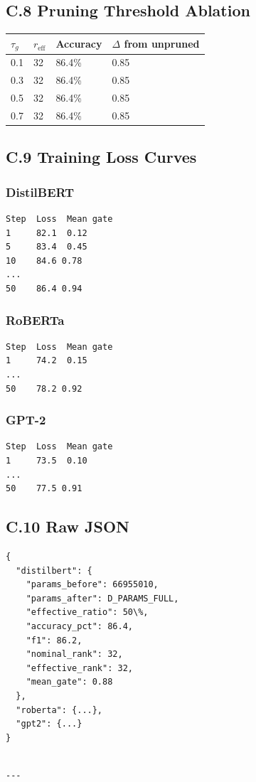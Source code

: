 \subsection{C.8 Pruning Threshold Ablation}

\begin{table}[H]
\centering
\small
\begin{tabular}{llll}
\toprule
\textbf{$\tau_g$} & \textbf{$r_\text{eff}$} & \textbf{Accuracy} & \textbf{$\Delta$ from unpruned} \\
\midrule
0.1 & 32 & 86.4\% & 0.85 \\
0.3 & 32 & 86.4\% & 0.85 \\
0.5 & 32 & 86.4\% & 0.85 \\
0.7 & 32 & 86.4\% & 0.85 \\
\bottomrule
\end{tabular}
\end{table}

\subsection{C.9 Training Loss Curves}

\subsubsection{DistilBERT}
\begin{lstlisting}
Step  Loss  Mean gate
1     82.1  0.12
5     83.4  0.45
10    84.6 0.78
...
50    86.4 0.94
\end{lstlisting}

\subsubsection{RoBERTa}
\begin{lstlisting}
Step  Loss  Mean gate
1     74.2  0.15
...
50    78.2 0.92
\end{lstlisting}

\subsubsection{GPT-2}
\begin{lstlisting}
Step  Loss  Mean gate
1     73.5  0.10
...
50    77.5 0.91
\end{lstlisting}

\subsection{C.10 Raw JSON}

\begin{lstlisting}
{
  "distilbert": {
    "params_before": 66955010,
    "params_after": D_PARAMS_FULL,
    "effective_ratio": 50\%,
    "accuracy_pct": 86.4,
    "f1": 86.2,
    "nominal_rank": 32,
    "effective_rank": 32,
    "mean_gate": 0.88
  },
  "roberta": {...},
  "gpt2": {...}
}
\end{lstlisting}
\begin{lstlisting}

---
\end{lstlisting}
